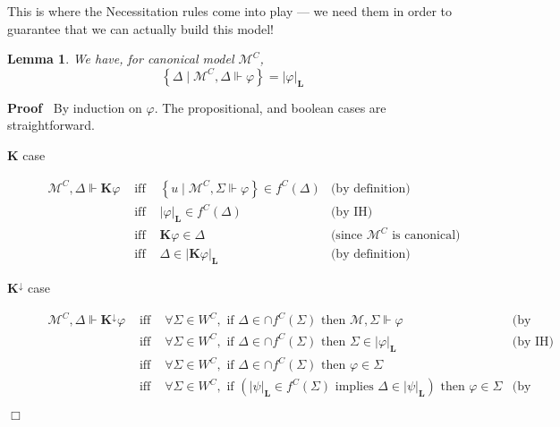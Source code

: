\documentclass{article}
\newcommand{\infixiff}{\text{ iff }}
\newcommand{\tmmathbf}[1]{\ensuremath{\boldsymbol{#1}}}
\newcommand{\tmtextbf}[1]{\text{{\bfseries{#1}}}}
\newenvironment{proof}{\noindent\textbf{Proof\ }}{\hspace*{\fill}$\Box$\medskip}
\newtheorem{lemma}{Lemma}
\providecommand{\infixiff}{\mathbin{\text{ iff }}}
\newcommand{\Model}{\ensuremath{\mathcal{M}}}
\newcommand{\Logic}{\ensuremath{\tmmathbf{\text{L}}}}
\newcommand{\Know}{\tmmathbf{\text{K}}}
\newcommand{\Knownby}{\tmmathbf{\text{K}^{\downarrow}}}
\begin{document}
\begin{note*}
  This is where the Necessitation rules come into play --- we need them in
  order to guarantee that we can actually build this model!
\end{note*}

\begin{lemma}
  {\cite[Lemma 2.13]{pacuit2017neighborhood}} \label{truth-lemma}
  \tmtextbf{(Truth Lemma)} We have, for canonical model $\Model^C$,
  \[ \left\{ \Delta \mid \Model^C, \Delta \Vdash \varphi \right\} = | \varphi
     |_{\Logic} \]
\end{lemma}

\begin{proof}
  By induction on $\varphi$. The propositional, and boolean cases are
  straightforward.
  \begin{description}
    \item[$\Know$ case]
    \[ \begin{array}{llll}
         \Model^C, \Delta \Vdash \Know \varphi & \infixiff & \left\{ u \mid
         \Model^C, \Sigma \Vdash \varphi \right\} \in f^C (\Delta) & \text{(by
         definition)}\\
         & \infixiff & | \varphi |_{\Logic} \in f^C (\Delta) & \text{(by
         IH)}\\
         & \infixiff & \Know \varphi \in \Delta & \text{(since $\Model^C$ is
         canonical)}\\
         & \infixiff & \Delta \in \left| \Know \varphi \right|_{\Logic} &
         \text{(by definition)}
       \end{array} \]
    \item[$\Knownby$ case]
    \[ \begin{array}{llll}
         \Model^C, \Delta \Vdash \Knownby \varphi & \infixiff & \forall \Sigma
         \in W^C, \text{ if } \Delta \in \cap f^C (\Sigma) \text{ then }
         \Model, \Sigma \Vdash \varphi & \text{(by definition)}\\
         & \infixiff & \forall \Sigma \in W^C, \text{ if } \Delta \in \cap
         f^C (\Sigma) \text{ then } \Sigma \in | \varphi |_{\Logic} &
         \text{(by IH)}\\
         & \infixiff & \forall \Sigma \in W^C, \text{ if } \Delta \in \cap
         f^C (\Sigma) \text{ then } \varphi \in \Sigma & \\
         & \infixiff & \forall \Sigma \in W^C, \text{ if } \left( | \psi
         |_{\Logic} \in f^C (\Sigma) \text{ implies } \Delta \in | \psi
         |_{\Logic} \right) \text{ then } \varphi \in \Sigma & \text{(by
}
\end{array}\]
\end{description}
\end{proof}
\end{document}

